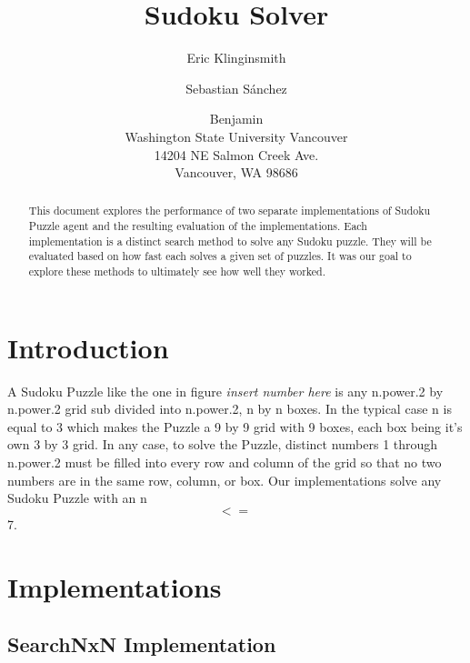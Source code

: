 \documentclass[letterpaper]{article}
\begin{document}
%
\title{Sudoku Solver}
\author{
    Eric Klinginsmith \and 
    Sebastian S\'{a}nchez 
    \and Benjamin\\
Washington State University Vancouver \\
14204 NE Salmon Creek Ave. \\
Vancouver, WA 98686
}

\maketitle
\begin{abstract}
This document explores the performance of two separate implementations of Sudoku Puzzle agent and the resulting evaluation of the implementations. Each implementation is a distinct search method to solve any Sudoku puzzle. They will be evaluated based on how fast each solves a given set of puzzles. It was our goal to explore these methods to ultimately see how well they worked.
\end{abstract}

\section{Introduction}

A Sudoku Puzzle like the one in figure \emph{insert number here} is any n.power.2 by n.power.2 grid sub divided into n.power.2, n by n boxes. In the typical case n is equal to 3 which makes the Puzzle a 9 by 9 grid with 9 boxes, each box being it's own 3 by 3 grid. In any case, to solve the Puzzle, distinct numbers 1 through n.power.2 must be filled into every row and column of the grid so that no two numbers are in the same row, column, or box. Our implementations solve any Sudoku Puzzle with an n $$ <=\ $$ 7.

\section{Implementations}

\subsection{SearchNxN Implementation}
\end{document}
